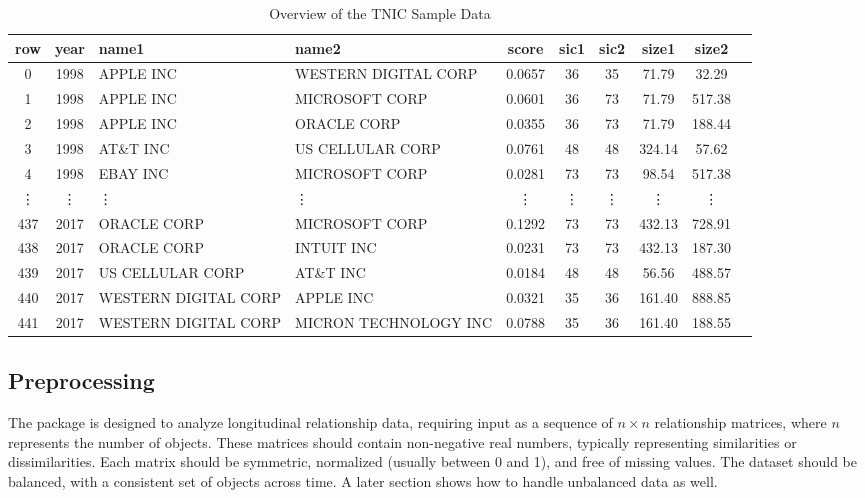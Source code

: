 \documentclass[article]{jss}
\begin{document}
\begin{table}[t!]
  \centering
  \begin{tabular}{ccp{3cm}p{3cm}cccccc}
  \hline
  row & year & name1 & name2 & score & sic1 & sic2 & size1 & size2 \\ 
  \hline
  0 & 1998 & APPLE INC & WESTERN DIGITAL CORP & 0.0657 & 36 & 35 & 71.79 & 32.29 \\
  1 & 1998 & APPLE INC & MICROSOFT CORP & 0.0601 & 36 & 73 & 71.79 & 517.38 \\
  2 & 1998 & APPLE INC & ORACLE CORP & 0.0355 & 36 & 73 & 71.79 & 188.44 \\
  3 & 1998 & AT\&T INC & US CELLULAR CORP & 0.0761 & 48 & 48 & 324.14 & 57.62 \\
  4 & 1998 & EBAY INC & MICROSOFT CORP & 0.0281 & 73 & 73 & 98.54 & 517.38 \\
  \vdots & \vdots & \vdots & \vdots & \vdots & \vdots & \vdots & \vdots & \vdots \\
  437 & 2017 & ORACLE CORP & MICROSOFT CORP & 0.1292 & 73 & 73 & 432.13 & 728.91 \\
  438 & 2017 & ORACLE CORP & INTUIT INC & 0.0231 & 73 & 73 & 432.13 & 187.30 \\
  439 & 2017 & US CELLULAR CORP & AT\&T INC & 0.0184 & 48 & 48 & 56.56 & 488.57 \\
  440 & 2017 & WESTERN DIGITAL CORP & APPLE INC & 0.0321 & 35 & 36 & 161.40 & 888.85 \\
  441 & 2017 & WESTERN DIGITAL CORP & MICRON TECHNOLOGY INC & 0.0788 & 35 & 36 & 161.40 & 188.55 \\
  \hline
  \end{tabular}
  \caption{Overview of the TNIC Sample Data} \label{tab:data-overview}
\end{table}
  
\subsection{Preprocessing}

The  package is designed to analyze longitudinal relationship data, requiring input as 
a sequence of $n \times n$ relationship matrices, where $n$ represents the number of objects. 
These matrices should contain non-negative real numbers, typically representing similarities or dissimilarities. 
Each matrix should be symmetric, normalized (usually between 0 and 1), and free of missing values. 
The dataset should be balanced, with a consistent set of objects across time. 
A later section shows how to handle unbalanced data as well.
\end{document}
